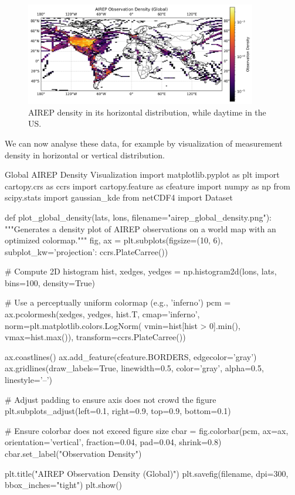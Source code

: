 \begin{figure}[ht]
    \centering
    \includegraphics[width=0.9\textwidth]{images/airep_global_density.png}
    \caption{AIREP density in its horizontal distribution, while daytime in the US.}
    \label{fig:airep_plot}
\end{figure}


We can now analyse these data, for example by visualization of measurement density in horizontal or vertical distribution. 

\begin{codeonly}{Global AIREP Density Visualization}
import matplotlib.pyplot as plt
import cartopy.crs as ccrs
import cartopy.feature as cfeature
import numpy as np
from scipy.stats import gaussian_kde
from netCDF4 import Dataset

def plot_global_density(lats, lons,
                        filename="airep_global_density.png"):
    """Generates a density plot of AIREP observations on a world map 
    with an optimized colormap."""
    fig, ax = plt.subplots(figsize=(10, 6),
                           subplot_kw={'projection': ccrs.PlateCarree()})
    
    # Compute 2D histogram
    hist, xedges, yedges = np.histogram2d(lons, lats,
                                          bins=100, density=True)
    
    # Use a perceptually uniform colormap (e.g., 'inferno')
    pcm = ax.pcolormesh(xedges, yedges, hist.T, cmap='inferno',
                        norm=plt.matplotlib.colors.LogNorm(
                            vmin=hist[hist > 0].min(),
                            vmax=hist.max()),
                        transform=ccrs.PlateCarree())
    
    ax.coastlines()
    ax.add_feature(cfeature.BORDERS, edgecolor='gray')
    ax.gridlines(draw_labels=True, linewidth=0.5,
                 color='gray', alpha=0.5, linestyle='--')
    
    # Adjust padding to ensure axis does not crowd the figure
    plt.subplots_adjust(left=0.1, right=0.9, top=0.9, bottom=0.1)
    
    # Ensure colorbar does not exceed figure size
    cbar = fig.colorbar(pcm, ax=ax, orientation='vertical',
                        fraction=0.04, pad=0.04, shrink=0.8)
    cbar.set_label("Observation Density")
    
    plt.title("AIREP Observation Density (Global)")
    plt.savefig(filename, dpi=300, bbox_inches="tight")
    plt.show()
\end{codeonly}



